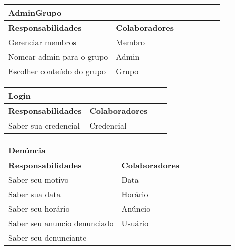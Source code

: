 \documentclass{article}
\begin{document}
    
    \begin{center}
   	 \begin{tabular}{|p{0.5\linewidth}|p{0.5\linewidth}|}
\hline
 	\multicolumn{2}{|p{\textwidth}|}{
{\large \textbf{AdminGrupo}}
}  \\
\hline
\textbf{Responsabilidades} & \textbf{Colaboradores} \\ 
\hline
  	Gerenciar membros & Membro \\
  	\hline
  	Nomear admin para o grupo & Admin \\
  	\hline
  	Escolher conteúdo do grupo & Grupo \\
  	\hline
   	\end{tabular} 
    \end{center}
    
    
    \begin{center}
   	 \begin{tabular}{|p{0.5\linewidth}|p{0.5\linewidth}|}
\hline
 	\multicolumn{2}{|p{\textwidth}|}{
{\large \textbf{Login}}
}  \\
\hline
\textbf{Responsabilidades} & \textbf{Colaboradores} \\ 
\hline
  	Saber sua credencial & Credencial \\
  	\hline
   	\end{tabular} 
    \end{center}
    
    
    \begin{center}
   	 \begin{tabular}{|p{0.5\linewidth}|p{0.5\linewidth}|}
\hline
 	\multicolumn{2}{|p{\textwidth}|}{
{\large \textbf{Denúncia}}
}  \\
\hline
\textbf{Responsabilidades} & \textbf{Colaboradores} \\ 
\hline
  	Saber seu motivo &  Data \\
  	\hline
  	Saber sua data &  Horário \\
  	\hline
  	Saber seu horário &  Anúncio \\
  	\hline
  	Saber seu anuncio denunciado & Usuário \\
  	\hline
  	Saber seu denunciante &  \\
  	\hline
   	\end{tabular} 
    \end{center}
    
\end{document}
